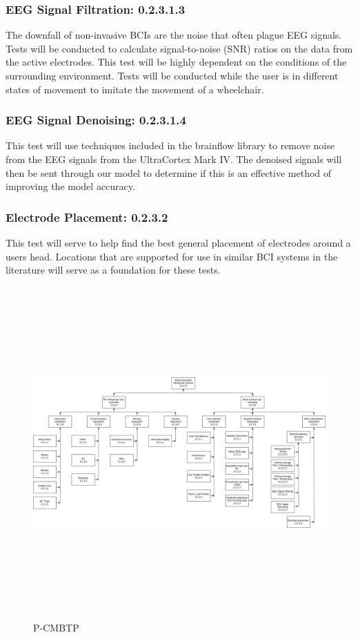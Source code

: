 \documentclass[conference]{IEEEtran}
\begin{document}
        \subsubsection{EEG Signal Filtration: 0.2.3.1.3}
        The downfall of non-invasive BCIs are the noise that often plague EEG signals. Tests will be conducted to calculate signal-to-noise (SNR) ratios on the data from the active electrodes. This test will be highly dependent on the conditions of the surrounding environment. Tests will be conducted while the user is in different states of movement to imitate the movement of a wheelchair.

        \subsubsection{EEG Signal Denoising: 0.2.3.1.4}
        This test will use techniques included in the brainflow library to remove noise from the EEG signals from the UltraCortex Mark IV. The denoised signals will then be sent through our model to determine if this is an effective method of improving the model accuracy. 
        
        \subsubsection{Electrode Placement: 0.2.3.2}
        This test will serve to help find the best general placement of electrodes around a users head. Locations that are supported for use in similar BCI systems in the literature will serve as a foundation for these tests.  
        
     

    \onecolumn
    \begin{figure}[htbp]
            \centerline{\includegraphics[height=5in,keepaspectratio, angle=90]{figs/F/testing_tree.png}}
            \caption{P-CMBTP}
            \label{fig:testing_plan}
        \end{figure}    
    \twocolumn
        
\end{document}
